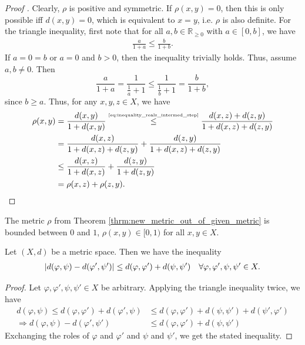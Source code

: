 \begin{proof}[Proof \cite{1860725, 686797}]
	Clearly, $\rho$ is positive and symmetric. If $\rho(x, y) = 0$, then this is only possible iff $d(x, y) = 0$, which is equivalent to $x = y$, i.e. $\rho$ is also definite. For the triangle inequality, first note that for all $a, b\in\mathbb R_{\geq 0}$ with $a\in [0, b]$, we have
	\begin{align}\label{eq:inequality_reals_intermed_step}
		\frac{a}{1 + a} \leq \frac{b}{1 + b}.
	\end{align} 
	If $a = 0 = b$ or $a = 0$ and $b > 0$, then the inequality trivially holds. Thus, assume $a, b\ne 0$. Then
	$$\frac{a}{1 + a} = \frac{1}{\frac{1}{a} + 1} \leq \frac{1}{\frac{1}{b} + 1} = \frac{b}{1 + b},$$ since $b\geq a$. Thus, for any $x, y, z\in X$, we have
	\begin{align*}
		\rho(x, y) &= \frac{d(x, y)}{1 + d(x, y)} \overset{\tiny\eqref{eq:inequality_reals_intermed_step}}{\leq} \frac{d(x, z) + d(z, y)}{1 + d(x, z) + d(z, y)} 
		\\ &= \frac{d(x, z)}{1 + d(x, z) + d(z, y)} + \frac{d(z, y)}{1 + d(x, z) + d(z, y)}
		\\ &\leq \frac{d(x, z)}{1 + d(x, z)} + \frac{d(z, y)}{1 + d(z, y)} 
		\\ &= \rho(x, z) + \rho(z, y).
	\end{align*}
\end{proof}

\begin{remark}
	The metric $\rho$ from Theorem \ref{thrm:new_metric_out_of_given_metric} is bounded between $0$ and $1$, $\rho(x, y) \in [0, 1)$ for all $x, y\in X$.
\end{remark}

\begin{theorem}\label{thrm:vierecksungleichung}
	Let $(X, d)$ be a metric space. Then we have the inequality
	\begin{align}
		\left\vert d(\varphi, \psi) - d(\varphi', \psi') \right\vert \leq d(\varphi, \varphi') + d(\psi, \psi') \quad \forall \varphi, \varphi', \psi, \psi'\in X.
	\end{align}
\end{theorem}

\begin{proof}
	Let $\varphi, \varphi', \psi, \psi'\in X$ be arbitrary. Applying the triangle inequality twice, we have
	\begin{align}
		d(\varphi, \psi) \leq d(\varphi, \varphi') + d(\varphi', \psi) &\leq d(\varphi, \varphi') + d(\psi, \psi') + d(\psi', \varphi')
		\\ \Rightarrow d(\varphi, \psi) - d(\varphi', \psi') &\leq d(\varphi, \varphi') + d(\psi, \psi')
	\end{align}
	Exchanging the roles of $\varphi$ and $\varphi'$ and $\psi$ and $\psi'$, we get the stated inequality.
\end{proof}

